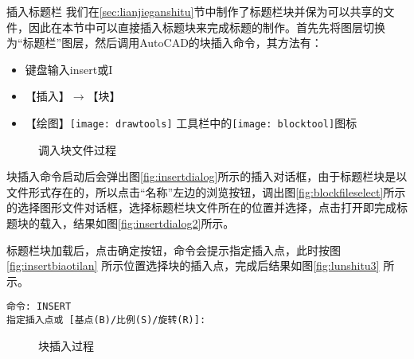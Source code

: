 \begin{procedure}
\item 插入标题栏
我们在\ref{sec:lianjieganshitu}节中制作了标题栏块并保为可以共享的文件，因此在本节中可以直接插入标题块来完成标题的制作。首先先将图层切换为“标题栏”图层，然后调用AutoCAD的块插入命令，其方法有：
\begin{itemize}
\item 键盘输入insert或I
\item 【插入】$\rightarrow $【块】
\item 【绘图】\texttt{[image: drawtools]} 工具栏中的\texttt{[image: blocktool]}图标
\end{itemize}

\begin{figure}[htbp]
\centering
{}\hspace{20pt}
\hspace{20pt}
\caption{调入块文件过程}
\end{figure}

块插入命令启动后会弹出图\ref{fig:insertdialog}所示的插入对话框，由于标题栏块是以文件形式存在的，所以点击“名称”左边的浏览按钮，调出图\ref{fig:blockfileselect}所示的选择图形文件对话框，选择标题栏块文件所在的位置并选择，点击打开即完成标题块的载入，结果如图\ref{fig:insertdialog2}所示。

标题栏块加载后，点击确定按钮，命令会提示指定插入点，此时按图\ref{fig:insertbiaotilan} 所示位置选择块的插入点，完成后结果如图\ref{fig:lunshitu3} 所示。
\begin{lstlisting}
命令: INSERT
指定插入点或 [基点(B)/比例(S)/旋转(R)]:
\end{lstlisting}

\begin{figure}[htbp]
\centering
{}\hspace{20pt}
\caption{块插入过程}
\end{figure}
\end{procedure}
